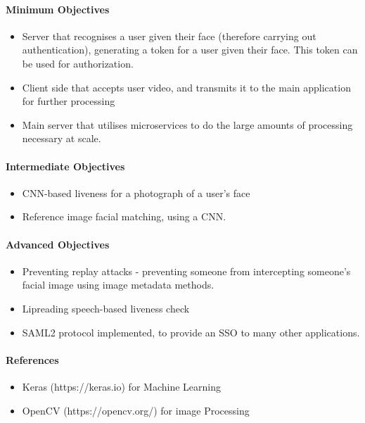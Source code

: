 \documentclass{article}
\begin{document}
    \paragraph{Minimum Objectives}
        \begin{itemize}
            \item Server that recognises a user given their face (therefore carrying out authentication), generating a token for a user given their face. This token can be used for authorization.
            \item Client side that accepts user video, and transmits it to the main application for further processing
            \item Main server that utilises microservices to do the large amounts of processing necessary at scale.
        \end{itemize}
    \paragraph{Intermediate Objectives}
        \begin{itemize}
            \item CNN-based liveness for a photograph of a user's face
            \item Reference image facial matching, using a CNN.
        \end{itemize}
    \paragraph{Advanced Objectives}
        \begin{itemize}
            \item Preventing replay attacks - preventing someone from intercepting someone's facial image using image metadata methods.
            \item Lipreading speech-based liveness check
            \item SAML2 protocol implemented, to provide an SSO to many other applications.
        \end{itemize}
    \paragraph{References}
        \begin{itemize}
            \item Keras (https://keras.io) for Machine Learning
            \item OpenCV (https://opencv.org/) for image Processing
        \end{itemize}

   
\end{document}
